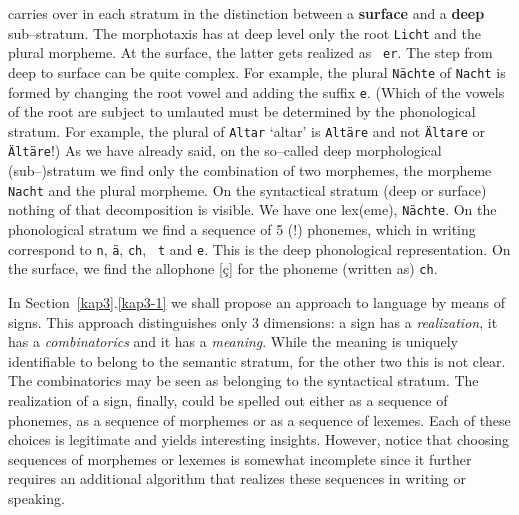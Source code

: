 carries over in each stratum in the distinction
between a \textbf{surface} and a \textbf{deep} sub--stratum. The
morphotaxis has at deep level only the root {\tt Licht} and the
plural morpheme. At the surface, the latter gets realized as {\tt
er}. The step from deep to surface can be quite complex. For
example, the plural {\tt N\"achte} of {\tt Nacht} is formed by
changing the root vowel and adding the suffix {\tt e}. 
(Which of the vowels of the root are subject to umlauted must be 
determined by the phonological stratum. For example, the plural of 
{\tt Altar} `altar' is {\tt Alt\"are} and not {\tt \"Altare} or {\tt
\"Alt\"are}!) As we have already said, on the so--called deep
morphological (sub--)stratum we find only the combination of two
morphemes, the morpheme {\tt Nacht} and the plural morpheme. On
the syntactical stratum (deep or surface) nothing of that
decomposition is visible. We have one lex(eme), {\tt N\"achte}.
On the phonological stratum we find a sequence of 5 (!) phonemes,
which in writing correspond to {\tt n}, {\tt \"a}, {\tt ch}, {\tt
t} and {\tt e}. This is the deep phonological representation. On
the surface, we find the allophone [\c{c}] for the phoneme
(written as) {\tt ch}.

In Section~\ref{kap3}.\ref{kap3-1} we shall propose an approach to language
by means of signs. This approach distinguishes only 3 dimensions: a
sign has a {\it realization}, it has a {\it combinatorics\/} and 
it has a {\it meaning}. While the meaning is uniquely identifiable 
to belong to the semantic stratum, for the other two this is not
clear. The combinatorics may be seen as belonging to the
syntactical stratum. The realization of a sign, finally, could be
spelled out either as a sequence of phonemes, as a sequence of
morphemes or as a sequence of lexemes. Each of these choices is
legitimate and yields interesting insights. However, notice that
choosing sequences of morphemes or lexemes is somewhat incomplete
since it further requires an additional algorithm that realizes
these sequences in writing or speaking.

